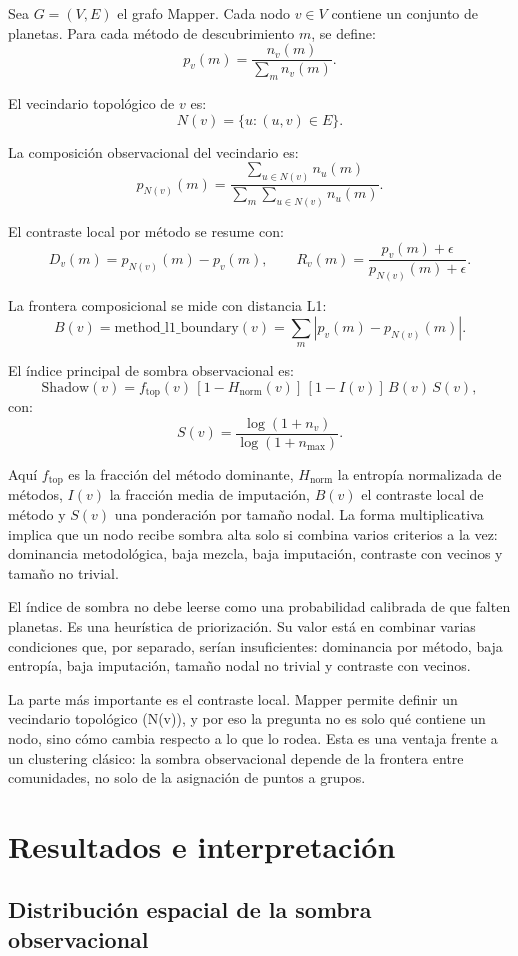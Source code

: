 \documentclass[11pt]{article}
\begin{document}
Sea $G=(V,E)$ el grafo Mapper. Cada nodo $v\in V$ contiene un conjunto de planetas. Para cada método de descubrimiento $m$, se define:
\[
p_v(m)=\frac{n_v(m)}{\sum_m n_v(m)}.
\]

El vecindario topológico de $v$ es:
\[
N(v)=\{u:(u,v)\in E\}.
\]

La composición observacional del vecindario es:
\[
p_{N(v)}(m)=\frac{\sum_{u\in N(v)} n_u(m)}{\sum_m\sum_{u\in N(v)}n_u(m)}.
\]

El contraste local por método se resume con:
\[
D_v(m)=p_{N(v)}(m)-p_v(m),\qquad
R_v(m)=\frac{p_v(m)+\epsilon}{p_{N(v)}(m)+\epsilon}.
\]

La frontera composicional se mide con distancia L1:
\[
B(v)=\mathrm{method\_l1\_boundary}(v)=\sum_m |p_v(m)-p_{N(v)}(m)|.
\]

El índice principal de sombra observacional es:
\[
\mathrm{Shadow}(v)=f_{\mathrm{top}}(v)\,[1-H_{\mathrm{norm}}(v)]\,[1-I(v)]\,B(v)\,S(v),
\]
con:
\[
S(v)=\frac{\log(1+n_v)}{\log(1+n_{\max})}.
\]

Aquí $f_{\mathrm{top}}$ es la fracción del método dominante, $H_{\mathrm{norm}}$ la entropía normalizada de métodos, $I(v)$ la fracción media de imputación, $B(v)$ el contraste local de método y $S(v)$ una ponderación por tamaño nodal. La forma multiplicativa implica que un nodo recibe sombra alta solo si combina varios criterios a la vez: dominancia metodológica, baja mezcla, baja imputación, contraste con vecinos y tamaño no trivial.

El índice de sombra no debe leerse como una probabilidad calibrada de que falten planetas. Es una heurística de priorización. Su valor está en combinar varias condiciones que, por separado, serían insuficientes: dominancia por método, baja entropía, baja imputación, tamaño nodal no trivial y contraste con vecinos.

La parte más importante es el contraste local. Mapper permite definir un vecindario topológico (N(v)), y por eso la pregunta no es solo qué contiene un nodo, sino cómo cambia respecto a lo que lo rodea. Esta es una ventaja frente a un clustering clásico: la sombra observacional depende de la frontera entre comunidades, no solo de la asignación de puntos a grupos.


\section{Resultados e interpretación}

\subsection{Distribución espacial de la sombra observacional}
\end{document}
